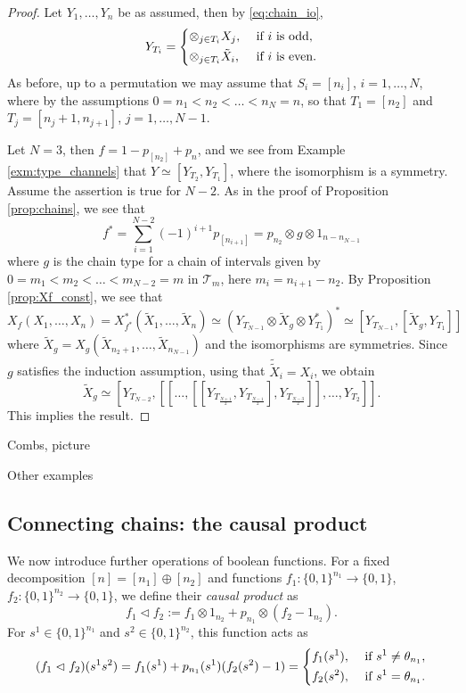 \documentclass[12pt]{article}
\theoremstyle{definition}
\theoremstyle{remark}
\def\Te{\mathcal T}
\def\vtl{\vartriangleleft}
\begin{document}
\begin{proof} Let $Y_1,\dots,Y_n$ be as assumed, then  by \eqref{eq:chain_io}, 
\[
Y_{T_i}=\begin{dcases} \otimes_{j\in T_i}X_j,  & \text{ if } i\text{ is odd},\\
\otimes_{j\in T_i}\tilde X_i,& \text{ if }i\text{ is even}.
\end{dcases}
\]
As before, up to a permutation we may assume that $S_i=[n_i]$, $i=1,\dots, N$, where by
the assumptions
$0=n_1<n_2<\dots<n_N=n$, so that $T_1=[n_2]$ and $T_j=[n_j+1,n_{j+1}]$, $j=1,\dots, N-1$. 

Let $N=3$, then $f=1-p_{[n_2]}+p_{n}$, and we see from Example \ref{exm:type_channels}
that  $Y\simeq [Y_{T_2}, Y_{T_1}]$, where the isomorphism is a symmetry. 
Assume the assertion is true for  $N-2$.  As in the proof of Proposition \ref{prop:chains}, we see that 
\[
f^*=\sum_{i=1}^{N-2}(-1)^{i+1}p_{[n_{i+1}]}=p_{n_2}\otimes g\otimes 1_{n-n_{N-1}}
\]
where $g$ is the chain type for  a chain of intervals given by $0=m_1<m_2<\dots<m_{N-2}=m$ in $\Te_m$,
here $m_i=n_{i+1}-n_2$. By Proposition \ref{prop:Xf_const}, we see that 
\[
X_f(X_1,\dots,X_n)=X_{f^*}^*(\tilde X_1,\dots, \tilde X_n)\simeq (Y_{T_{N-1}}\otimes
\tilde X_g\otimes Y^*_{T_1})^*\simeq [Y_{T_{N-1}},[\tilde X_g,Y_{T_1}]]
\]
where $\tilde X_g=X_g(\tilde X_{n_2+1},\dots, \tilde X_{n_{N-1}})$ and the isomorphisms are
symmetries. Since $g$ satisfies the induction assumption, using that $\tilde {\tilde
X}_i=X_i$, we obtain 
\[
\tilde X_g\simeq
[Y_{T_{N-2}},[[\dots,[[Y_{T_{\frac{N+1}2}},Y_{T_{\frac{N-1}2}}],Y_{T_{\frac{N-3}2}}]],\dots,Y_{T_2}]].
\]
This implies the result.


\end{proof}

Combs, picture

Other examples



\subsection{Connecting chains: the causal product}


We now  introduce further operations of boolean functions. 
For a fixed decomposition $[n]=[n_1]\oplus[n_2]$ and functions
$f_1:\{0,1\}^{n_1}\to \{0,1\}$, $f_2:\{0,1\}^{n_2}\to \{0,1\}$, we define their {\em
causal product} as 
\[
f_1\vartriangleleft f_2:=f_1\otimes 1_{n_2}+p_{n_1}\otimes (f_2-1_{n_2}).
\]
For  $s^1\in \{0,1\}^{n_1}$ and $s^2\in \{0,1\}^{n_2}$, this function acts as
\begin{equation}\label{eq:causal_product}
(f_1\vtl f_2)(s^1s^2)= f_1(s^1)+p_{n_1}(s^1)(f_2(s^2)-1)=\begin{dcases} f_1(s^1), &
\text{ if } s^1\ne \theta_{n_1},\\
   f_2(s^2), & \text{ if } s^1=\theta_{n_1}.
   \end{dcases}
\end{equation}
\end{document}
